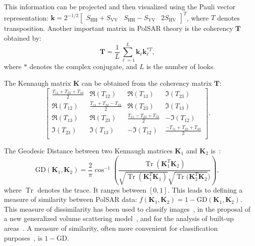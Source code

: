 \documentclass[conference]{IEEEtran}
\DeclareMathOperator{\Tr}{Tr}
\begin{document}
This information can be projected and then visualized using the Pauli vector representation:
$\bm{k} = 2^{-1/2} 
\begin{bmatrix}
S_{\text{HH}} + S_{\text{VV}} &S_{\text{HH}} - S_{\text{VV}} &2S_{\text{HV}}
\end{bmatrix}^T
$, 
where $T$ denotes transposition. 
Another important matrix in PolSAR theory is the coherency $\bm{T}$ obtained by:
$$
\bm{T} = \frac{1}{L} \sum_{\ell=1}^{L}\textbf{k}_\ell \textbf{k}_\ell^{*T},
$$
where $*$ denotes the complex conjugate, and $L$ is the number of looks.

The Kennaugh matrix $\bm{K}$ can be obtained from the coherency matrix $\bm{T}$:
\[
\begin{bmatrix}
\frac{ T_{11} + T_{22} + T_{33} }{2} & \Re(T_{12}) & \Re(T_{13}) & \Im(T_{23})\\
\Re(T_{12}) & \frac{T_{11} + T_{22} - T_{33}}{2} & \Re(T_{23}) & \Im(T_{13})\\
\Re(T_{13}) & \Re(T_{23}) & \frac{ T_{11} - T_{22} + T_{33} }{2} & -\Im(T_{12})\\
\Im(T_{23}) & \Im(T_{13}) & -\Im(T_{12}) & \frac{ -T_{11} + T_{22} + T_{33} }{2}\\
\end{bmatrix}
.\]

The Geodesic Distance between two Kennaugh matrices $\bm K_1$ and $\bm K_2$ is~\cite{ClassificationPolSARGeodesic}: 
\begin{displaymath}
\text{GD}(\bm K_1, \bm K_2) = \frac{2}{\pi} \cos^{-1} \left(\frac{\Tr(\bm K_1^T \bm K_2)}{\sqrt{\Tr(\bm K_1^T \bm K_1)} \sqrt{\Tr(\bm K_2^T \bm K_2})} \right),
\end{displaymath}
where $\Tr$ denotes the trace.
It ranges between $[0,1]$.
This leads to defining a measure of similarity between PolSAR data: $f(\bm K_1, \bm K_2) = 1 - \text{GD}(\bm K_1, \bm K_2)$. 
This measure of dissimilarity has been used to 
classify images~\cite{ClassificationPolSARGeodesic},
in the proposal of a new generalized volume scattering model~\cite{AGeneralizedVolumeScatteringModelBasedVegetationIndexfromPolarimetricSARData2019},
and for the analysis of built-up areas~\cite{NovelTechniquesforBuiltupAreaExtractionfromPolarimetricSARImages2019}.
A measure of similarity, often more convenient for classification purposes~\cite{FreryCorreiaFreitas:ClassifMultifrequency:IEEE:2007}, is $1-\text{GD}$.
\end{document}
